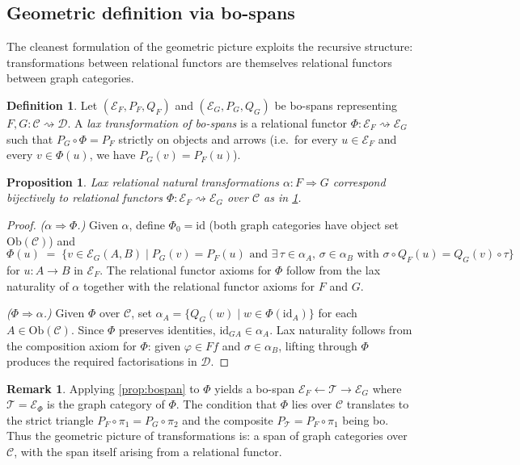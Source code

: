 \documentclass{article}
\theoremstyle{plain}
\newtheorem{proposition}[theorem]{Proposition}
\theoremstyle{definition}
\newtheorem{definition}[theorem]{Definition}
\newtheorem{remark}[theorem]{Remark}
\newcommand{\Ob}{\mathrm{Ob}}
\newcommand{\id}{\mathrm{id}}
\newcommand{\cC}{\mathcal{C}}
\newcommand{\cD}{\mathcal{D}}
\newcommand{\cE}{\mathcal{E}}
\newcommand{\cT}{\mathcal{T}}
\begin{document}
\subsection{Geometric definition via bo-spans}\label{ssec:transbospan}

The cleanest formulation of the geometric picture exploits the recursive structure: transformations between relational functors are themselves relational functors between graph categories.

\begin{definition}\label{def:transbospan}
Let $(\cE_F, P_F, Q_F)$ and $(\cE_G, P_G, Q_G)$ be bo-spans representing $F, G\colon \cC \rightsquigarrow \cD$.  A \emph{lax transformation of bo-spans} is a relational functor $\Phi\colon \cE_F \rightsquigarrow \cE_G$ such that $P_G \circ \Phi = P_F$ strictly on objects and arrows (i.e.\ for every $u \in \cE_F$ and every $v \in \Phi(u)$, we have $P_G(v) = P_F(u)$).
\end{definition}

\begin{proposition}\label{prop:transbospan}
Lax relational natural transformations $\alpha\colon F \Rightarrow G$ correspond bijectively to relational functors $\Phi\colon \cE_F \rightsquigarrow \cE_G$ over $\cC$ as in \cref{def:transbospan}.
\end{proposition}

\begin{proof}
\textit{($\alpha \Rightarrow \Phi$.)}
Given $\alpha$, define $\Phi_0 = \id$ (both graph categories have object set $\Ob(\cC)$) and
\[
    \Phi(u) \;=\; \bigl\{v \in \cE_G(A,B) \;\big|\; P_G(v) = P_F(u) \text{ and } \exists\, \tau \in \alpha_A,\, \sigma \in \alpha_B \text{ with } \sigma \circ Q_F(u) = Q_G(v) \circ \tau \bigr\}
\]
for $u\colon A \to B$ in $\cE_F$.  The relational functor axioms for $\Phi$ follow from the lax naturality of $\alpha$ together with the relational functor axioms for $F$ and $G$.

\smallskip\noindent
\textit{($\Phi \Rightarrow \alpha$.)}
Given $\Phi$ over $\cC$, set $\alpha_A = \{Q_G(w) \mid w \in \Phi(\id_A)\}$ for each $A \in \Ob(\cC)$.  Since $\Phi$ preserves identities, $\id_{GA} \in \alpha_A$.  Lax naturality follows from the composition axiom for $\Phi$: given $\varphi \in Ff$ and $\sigma \in \alpha_B$, lifting through $\Phi$ produces the required factorisations in $\cD$.
\end{proof}

\begin{remark}\label{rmk:recursive}
Applying \cref{prop:bospan} to $\Phi$ yields a bo-span $\cE_F \leftarrow \cT \to \cE_G$ where $\cT = \cE_\Phi$ is the graph category of $\Phi$.  The condition that $\Phi$ lies over $\cC$ translates to the strict triangle $P_F \circ \pi_1 = P_G \circ \pi_2$ and the composite $P_\cT = P_F \circ \pi_1$ being bo.  Thus the geometric picture of transformations is: a span of graph categories over $\cC$, with the span itself arising from a relational functor.
\end{remark}
\end{document}
